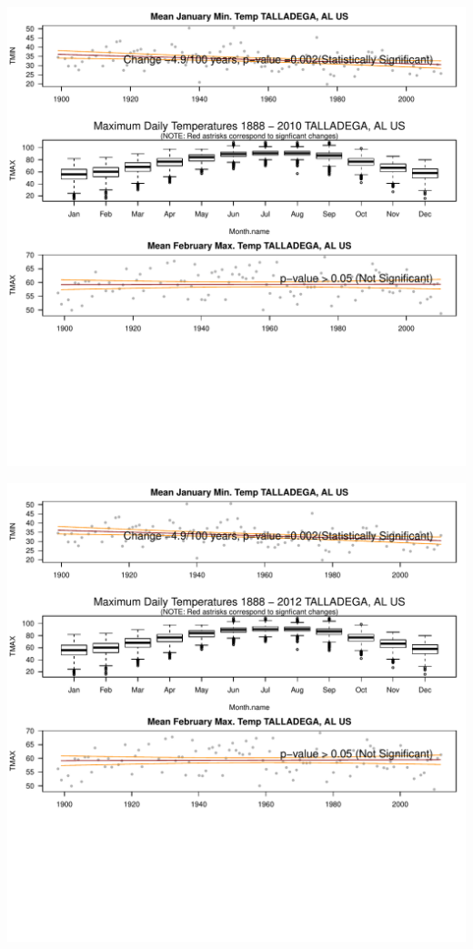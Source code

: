 \documentclass{article}\usepackage[]{graphicx}\usepackage[]{color}
\makeatletter
\def\maxwidth{ %
  \ifdim\Gin@nat@width>\linewidth
    \linewidth
  \else
    \Gin@nat@width
  \fi
}
\newenvironment{knitrout}{}{} %
\makeatother
\begin{document}
\begin{knitrout}
\includegraphics[width=\maxwidth]{figure/static_template-51} 

\includegraphics[width=\maxwidth]{figure/static_template-52} 


\end{knitrout}
\end{document}
